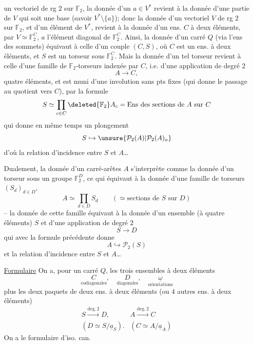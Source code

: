 un vectoriel  de rg $2$ sur $\mathbb{F}_2$, la donnée d'un $a\in V^*$ revient à la donnée d'une partie de $V$ qui soit une base (savoir $V^*\setminus\{a\}$); donc la donnée d'un  vectoriel $V$ de rg $2$ sur $\mathbb{F}_2$, et d'un élément  de $V^*$, revient à la donnée d'un ens. $C$ à deux éléments, par $V\simeq\mathbb{F}_2^C$, $a$ l'élément diagonal de $\mathbb{F}_2^C$.
Ainsi, la donnée d'un carré $Q$  (via l'ens des sommets) équivaut à celle d'un couple $(C,S)$, où $C$  est un ens. à deux éléments, et $S$ est un torseur sous $\mathbb{F}_2^C$. Mais la donnée d'un tel torseur revient à celle d'une famille de $\mathbb{F}_2$-torseurs indexée par $C$, i.e. d'une application de degré $2$
\[
A\longrightarrow C,
\]
 quatre éléments, et est muni d'une involution sans pts fixes (qui donne le passage au quotient vers $C$), par la formule
\[
S\simeq\prod_{c\in C}\deleted{\mathbb{F}_2}A_c
=\text{Ens des sections de $A$ sur $C$}
\]
qui donne en même temps un plongement
\[
S\hookrightarrow\unsure{\mathcal{P}_2(A)|\mathcal{P}_2(A)_a}
\]
d'où la relation d'incidence entre $S$ et $A$\ldots
{}

Dualement,  la donnée d'un carré-arêtes $A$ s'interprète comme la donnée d'un torseur sous un groupe $\mathbb{F}_2^D$, ce qui équivaut à la donnée d'une famille de torseurs $(S_d)_{d\in D}$, 
\[
A\simeq\prod_{d\in D}S_d\qquad(\simeq\text{sections de $S$ sur $D$})
\]
-- la donnée de cette famille équivaut à la donnée d'un ensemble (à quatre éléments) $S$ et d'une application de degré $2$
\[
S\longrightarrow D
\]
qui avec la formule précédente donne
\[
A\hookrightarrow\mathcal{P}_2(S)
\]
et la relation d'incidence entre $S$ et $A$\ldots

\uline{Formulaire} On a, pour un carré $Q$, les trois ensembles à deux éléments
\[
\underset{\text{codiagonales}}{C},\quad
\underset{\text{diagonales}}{D},\quad
\underset{\text{orientations}}{\underline{\omega}}
\]
plus les deux paquets de deux ens. à deux éléments (ou $4$ autres ens. à deux éléments)
\[
\begin{array}{cc}
S\xrightarrow{\mathrm{deg.}\,2}D,&A\xrightarrow{\mathrm{deg.}\,2}C\\
(D\simeq S/\underline{a}_S).&(C\simeq A/\underline{a}_A)
\end{array}
\]
On a le formulaire d'iso. can.

